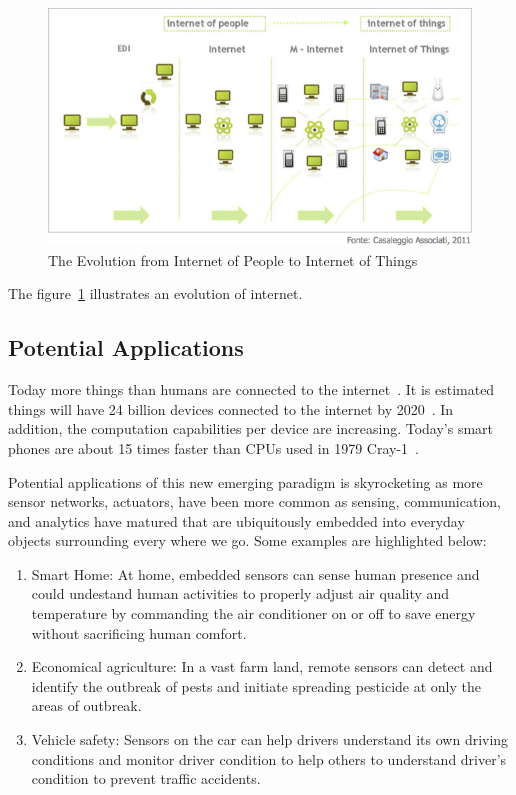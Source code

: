 \begin{figure}[h!]
\caption{The Evolution from Internet of People to Internet of Things}
\label{fig:evolution}
\centering
    \includegraphics[width=\linewidth]{figures/evolution}
\end{figure}

The figure~\ref{fig:evolution} illustrates an evolution of internet.

\subsection{Potential Applications}

Today more things than humans are connected to the internet~\cite{CISCO}. It is
estimated things will have 24 billion devices connected to the internet by
2020~\cite{Malik}. In addition, the computation capabilities per device are
increasing. Today's smart phones are about 15 times faster than CPUs used in
1979 Cray-1~\cite{Randomly2010}. 

Potential applications of this new emerging paradigm is skyrocketing as more
sensor networks, actuators, have been more common as sensing, communication, and
analytics have matured that are ubiquitously embedded into everyday objects
surrounding every where we go. Some examples are highlighted below:
\begin{enumerate}
\item Smart Home: At home, embedded sensors can sense human presence and could
undestand human activities to properly adjust air quality and temperature by
commanding the air conditioner on or off to save energy without sacrificing
human comfort.
\item Economical agriculture: In a vast farm land, remote sensors can detect and
identify the outbreak of pests and initiate spreading pesticide at only the
areas of outbreak.
\item Vehicle safety: Sensors on the car can help drivers understand its own
driving conditions and monitor driver condition to help others to understand
driver's condition to prevent traffic accidents.
\end{enumerate}

